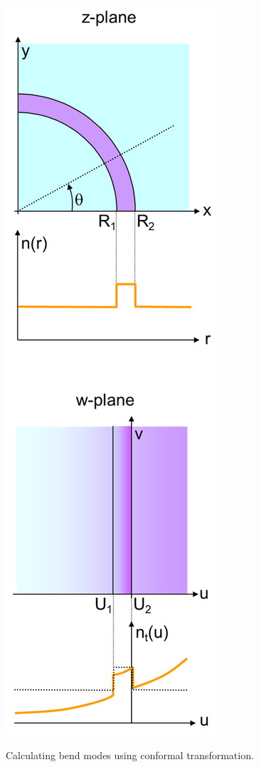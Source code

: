 
\begin{marginfigure}[1cm]
\centering
\includegraphics{complex/figures/bends_portrait}
\caption{Calculating bend modes using conformal transformation.}
\label{fig-bends}
\end{marginfigure}

